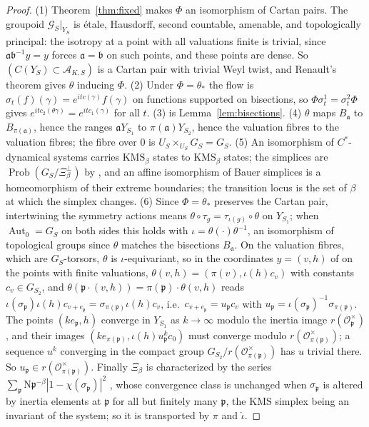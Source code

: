 \documentclass[11pt]{amsart}
\numberwithin{equation}{section}
\theoremstyle{definition}
\theoremstyle{remark}
\newcommand{\cA}{\mathcal{A}}
\newcommand{\cG}{\mathcal{G}}
\newcommand{\cO}{\mathcal{O}}
\newcommand{\pp}{\mathfrak{p}}
\newcommand{\aaa}{\mathfrak{a}}
\newcommand{\bb}{\mathfrak{b}}
\newcommand{\Ns}{\mathrm{N}}
\newcommand{\Prob}{\operatorname{Prob}}
\begin{document}
\begin{proof}
(1) Theorem~\ref{thm:fixed} makes $\Phi$ an isomorphism of Cartan pairs. The groupoid
$\cG_S|_{Y_S}$ is \'etale, Hausdorff, second countable, amenable, and topologically
principal: the isotropy at a point with all valuations finite is trivial, since
$\aaa\bb^{-1}y=y$ forces $\aaa=\bb$ on such points, and these points are dense. So
$(C(Y_S)\subset\cA_{K,S})$ is a Cartan pair with trivial Weyl twist, and Renault's theorem
\cite{Renault} gives $\theta$ inducing $\Phi$. (2) Under $\Phi=\theta_*$ the flow is
$\sigma_t(f)(\gamma)=e^{itc(\gamma)}f(\gamma)$ on functions supported on bisections, so
$\Phi\sigma^1_t=\sigma^2_t\Phi$ gives $e^{itc_2(\theta\gamma)}=e^{itc_1(\gamma)}$ for all $t$.
(3) is Lemma~\ref{lem:bisections}. (4) $\theta$ maps $B_\aaa$ to $B_{\pi(\aaa)}$, hence the
ranges $\aaa Y_{S_1}$ to $\pi(\aaa)Y_{S_2}$, hence the valuation fibres to the valuation
fibres; the fibre over $0$ is $U_S\times_{U_S}G_S=G_S$. (5) An isomorphism of
$C^*$-dynamical systems carries $\mathrm{KMS}_\beta$ states to $\mathrm{KMS}_\beta$ states; the
simplices are $\Prob(G_S/\Xi_\beta^\perp)$ by \cite[Thm.~3.6]{Main}, and an affine isomorphism
of Bauer simplices is a homeomorphism of their extreme boundaries; the transition locus is
the set of $\beta$ at which the simplex changes. (6) Since $\Phi=\theta_*$ preserves the
Cartan pair, intertwining the symmetry actions means $\theta\circ\tau_g=\tau_{\iota(g)}\circ\theta$
on $Y_{S_1}$; when $\operatorname{Aut}_0=G_S$ on both sides this holds with
$\iota=\theta(\cdot)\theta^{-1}$, an isomorphism of topological groups since $\theta$ matches
the bisections $B_\aaa$. On the valuation fibres, which are $G_S$-torsors, $\theta$ is
$\iota$-equivariant, so in the coordinates $y=(v,h)$ of \cite[Lem.~2.10]{Main} on the points
with finite valuations, $\theta(v,h)=(\pi(v),\iota(h)c_v)$ with constants $c_v\in G_{S_2}$, and
$\theta(\pp\cdot(v,h))=\pi(\pp)\cdot\theta(v,h)$ reads
$\iota(\sigma_\pp)\iota(h)c_{v+e_\pp}=\sigma_{\pi(\pp)}\iota(h)c_v$, i.e.\
$c_{v+e_\pp}=u_\pp c_v$ with $u_\pp=\iota(\sigma_\pp)^{-1}\sigma_{\pi(\pp)}$. The points
$(ke_\pp,h)$ converge in $Y_{S_1}$ as $k\to\infty$ modulo the inertia image $r(\cO_\pp^\times)$,
and their images $(ke_{\pi(\pp)},\iota(h)u_\pp^kc_0)$ must converge modulo
$r(\cO_{\pi(\pp)}^\times)$; a sequence $u^k$ converging in the compact group
$G_{S_2}/r(\cO_{\pi(\pp)}^\times)$ has $u$ trivial there. So $u_\pp\in r(\cO_{\pi(\pp)}^\times)$.
Finally $\Xi_\beta$ is characterized by the series $\sum_\pp\Ns\pp^{-\beta}|1-\chi(\sigma_\pp)|^2$
\cite[(1.1)]{Main}, whose convergence class is unchanged when $\sigma_\pp$ is altered by
inertia elements at $\pp$ for all but finitely many $\pp$, the $\mathrm{KMS}$ simplex being
an invariant of the system; so it is transported by $\pi$ and $\hat\iota$.
\end{proof}
\end{document}
